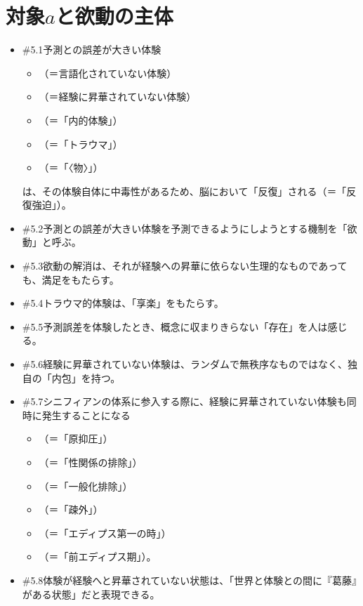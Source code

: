 \section{\texorpdfstring{対象\(a\)と欲動の主体}{対象aと欲動の主体}}\label{ux5bfeux8c61aux3068ux6b32ux52d5ux306eux4e3bux4f53}

\begin{note}{}
  \begin{itemize}
    \tightlist
    \item{\#5.1}予測との誤差が大きい体験
      \begin{itemize}
        \tightlist
        \item （＝言語化されていない体験）
        \item （＝経験に昇華されていない体験）
        \item （＝「内的体験」）
        \item （＝「トラウマ」）
        \item （＝「〈物〉」）
      \end{itemize}は、その体験自体に中毒性があるため、脳において「反復」される（＝「反復強迫」）。
    \item{\#5.2}予測との誤差が大きい体験を予測できるようにしようとする機制を「欲動」と呼ぶ。
    \item{\#5.3}欲動の解消は、それが経験への昇華に依らない生理的なものであっても、満足をもたらす。
    \item{\#5.4}トラウマ的体験は、「享楽」をもたらす。
    \item{\#5.5}予測誤差を体験したとき、概念に収まりきらない「存在」を人は感じる。
    \item{\#5.6}経験に昇華されていない体験は、ランダムで無秩序なものではなく、独自の「内包」を持つ。
    \item{\#5.7}シニフィアンの体系に参入する際に、経験に昇華されていない体験も同時に発生することになる
      \begin{itemize}
        \tightlist
        \item （＝「原抑圧」）
        \item （＝「性関係の排除」）
        \item （＝「一般化排除」）
        \item （＝「疎外」）
        \item （＝「エディプス第一の時」）  
        \item （＝「前エディプス期」）。
      \end{itemize}
    \item{\#5.8}体験が経験へと昇華されていない状態は、「世界と体験との間に『葛藤』がある状態」だと表現できる。

\end{itemize}
\end{note}
